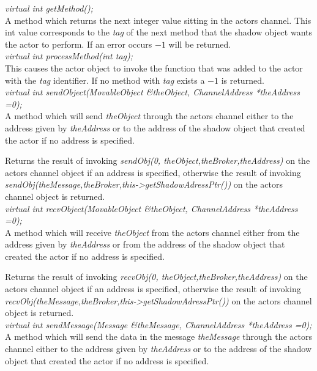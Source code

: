 {\em virtual int  getMethod();} \\
A method which returns the next integer value sitting in the actors
channel. This int value corresponds to the {\em tag} of the next
method that the shadow object wants the actor to perform. If an error
occurs $-1$ will be returned. \\

{\em virtual int  processMethod(int tag);}\\
This causes the actor object to invoke the function that was added to
the actor with the {\em tag} identifier. If no method with {\em tag}
exists a $-1$ is returned. \\


{\em virtual int sendObject(MovableObject \&theObject, ChannelAddress
*theAddress =0);}\\
A method which will send {\em theObject}
through the actors channel either to the address given by {\em
theAddress} or to the address of the shadow object that created the
actor if no address is specified.

Returns the result of invoking {\em sendObj(0, theObject,theBroker,theAddress)} on
the actors channel object if an address is specified, otherwise
the result of invoking {\em
sendObj(theMessage,theBroker,this->getShadowAdressPtr())} on the
actors channel object is returned. \\ 

{\em virtual int recvObject(MovableObject \&theObject, ChannelAddress
*theAddress =0);}\\
A method which will receive {\em theObject}
from the actors channel either from the address given by {\em
theAddress} or from the address of the shadow object that created the
actor if no address is specified.

Returns the result of invoking {\em recvObj(0, theObject,theBroker,theAddress)} on
the actors channel object if an address is specified, otherwise
the result of invoking {\em
recvObj(theMessage,theBroker,this->getShadowAdressPtr())} on the actors channel
object is returned. \\ 



{\em virtual int sendMessage(Message \&theMessage, ChannelAddress
*theAddress =0);}\\
A method which will send the data in the message {\em theMessage} 
through the actors channel either to the address given by {\em
theAddress} or to the address of the shadow object that created the
actor if no address is specified.

